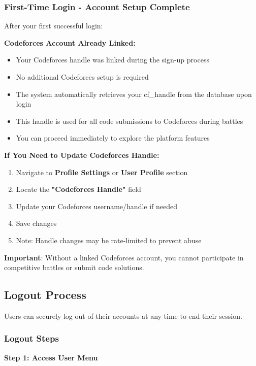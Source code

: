 \documentclass[12pt,a4paper]{article}
\begin{document}
\subsubsection{First-Time Login - Account Setup Complete}

After your first successful login:

\textbf{Codeforces Account Already Linked:}
\begin{itemize}[leftmargin=*]
\item Your Codeforces handle was linked during the sign-up process
\item No additional Codeforces setup is required
\item The system automatically retrieves your cf\_handle from the database upon login
\item This handle is used for all code submissions to Codeforces during battles
\item You can proceed immediately to explore the platform features
\end{itemize}

\textbf{If You Need to Update Codeforces Handle:}
\begin{enumerate}
\item Navigate to \textbf{Profile Settings} or \textbf{User Profile} section
\item Locate the \textbf{"Codeforces Handle"} field
\item Update your Codeforces username/handle if needed
\item Save changes
\item Note: Handle changes may be rate-limited to prevent abuse
\end{enumerate}


\textbf{Important}: Without a linked Codeforces account, you cannot participate in competitive battles or submit code solutions.

\FloatBarrier

\subsection{Logout Process}

Users can securely log out of their accounts at any time to end their session.

\subsubsection{Logout Steps}

\textbf{Step 1: Access User Menu}
\end{document}
